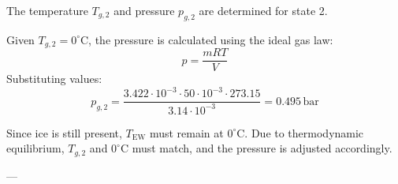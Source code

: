 The temperature \( T_{g,2} \) and pressure \( p_{g,2} \) are determined for state 2.  

Given \( T_{g,2} = 0^\circ\text{C} \), the pressure is calculated using the ideal gas law:  
\[
p = \frac{mRT}{V}
\]  
Substituting values:  
\[
p_{g,2} = \frac{3.422 \cdot 10^{-3} \cdot 50 \cdot 10^{-3} \cdot 273.15}{3.14 \cdot 10^{-3}} = 0.495 \, \text{bar}
\]  

Since ice is still present, \( T_{\text{EW}} \) must remain at \( 0^\circ\text{C} \). Due to thermodynamic equilibrium, \( T_{g,2} \) and \( 0^\circ\text{C} \) must match, and the pressure is adjusted accordingly.  

---